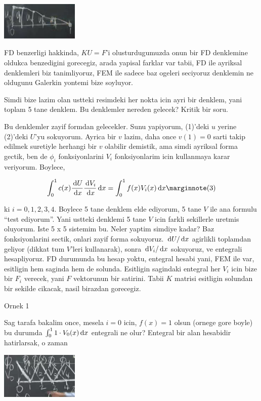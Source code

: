 \documentclass[12pt,fleqn]{article}\usepackage{../../common}
\begin{document}
\includegraphics[width=10em]{compscieng_1_18_04.png}

FD benzerligi hakkinda, $KU=F$'i olusturdugumuzda onun bir FD denklemine oldukca
benzedigini gorecegiz, arada yapisal farklar var tabii, FD ile ayriksal
denklemleri biz tanimliyoruz, FEM ile sadece baz ogeleri seciyoruz denklemin
ne oldugunu Galerkin yontemi bize soyluyor.

Simdi bize lazim olan ustteki resimdeki her nokta icin ayri bir denklem, yani
toplam 5 tane denklem. Bu denklemler nereden gelecek? Kritik bir soru.

Bu denklemler zayif formdan gelecekler. Sunu yapiyorum, (1)'deki $u$ yerine
(2)'deki $U$'yu sokuyorum. Ayrica bir $v$ lazim, daha once $v(1)=0$ sarti takip
edilmek suretiyle herhangi bir $v$ olabilir demistik, ama simdi ayriksal forma
gectik, ben de $\phi_i$ fonksiyonlarini $V_i$ fonksiyonlarim icin kullanmaya
karar veriyorum. Boylece,

$$
\int _{0}^{1} c(x) \frac{\ud U}{\ud x} \frac{\ud V_i}{\ud x} \ud x =
\int _{0}^{1} f(x) V_i(x) \ud x
\mlabel{3}
$$

ki $i=0,1,2,3,4$. Boylece 5 tane denklem elde ediyorum, 5 tane $V$ ile ana
formulu ``test ediyorum''. Yani ustteki denklemi 5 tane $V$ icin farkli
sekillerle uretmis oluyorum. Iste 5 x 5 sistemim bu. Neler yaptim simdiye kadar?
Baz fonksiyonlarini sectik, onlari zayif forma sokuyoruz. $\,\mathrm{d} U / \,\mathrm{d} x$
agirlikli toplamdan geliyor (dikkat tum $V$'leri kullanarak), sonra
$\,\mathrm{d} V_i / \,\mathrm{d} x$ sokuyoruz, ve entegrali hesapliyoruz. FD durumunda bu
hesap yoktu, entegral hesabi yani, FEM ile var, esitligin hem saginda hem de
solunda.  Esitligin sagindaki entegral her $V_i$ icin bize bir $F_i$ verecek,
yani $F$ vektorunun bir satirini. Tabii $K$ matrisi esitligin solundan
bir sekilde cikacak, nasil birazdan gorecegiz.

Ornek 1

Sag tarafa bakalim once, mesela $i=0$ icin, $f(x)=1$ olsun (ornege gore
boyle) bu durumda $\int_{0}^{1} 1 \cdot V_0(x) \,\mathrm{d} x$ entegrali ne
olur? Entegral bir alan hesabidir hatirlarsak, o zaman 

\includegraphics[width=10em]{compscieng_1_18_05.png}
\end{document}
